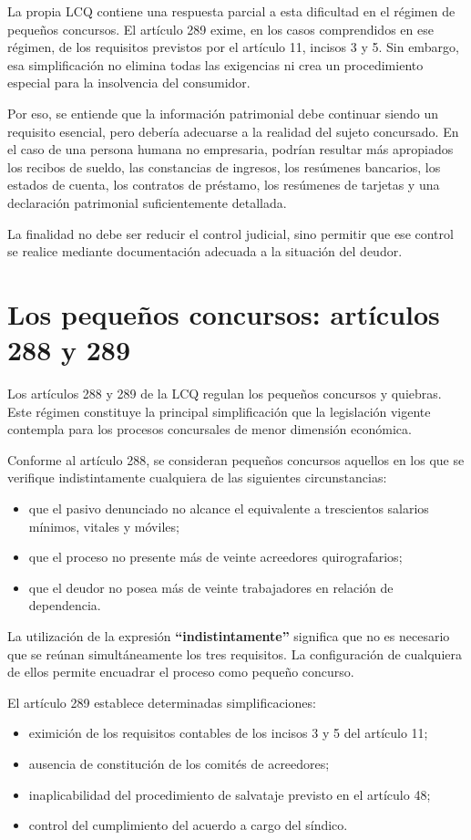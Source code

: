 \documentclass[12pt,oneside]{book}
\begin{document}
La propia LCQ contiene una respuesta parcial a esta dificultad en el régimen de pequeños concursos. El artículo 289 exime, en los casos comprendidos en ese régimen, de los requisitos previstos por el artículo 11, incisos 3 y 5. Sin embargo, esa simplificación no elimina todas las exigencias ni crea un procedimiento especial para la insolvencia del consumidor.

Por eso, se entiende que la información patrimonial debe continuar siendo un requisito esencial, pero debería adecuarse a la realidad del sujeto concursado. En el caso de una persona humana no empresaria, podrían resultar más apropiados los recibos de sueldo, las constancias de ingresos, los resúmenes bancarios, los estados de cuenta, los contratos de préstamo, los resúmenes de tarjetas y una declaración patrimonial suficientemente detallada.

La finalidad no debe ser reducir el control judicial, sino permitir que ese control se realice mediante documentación adecuada a la situación del deudor.

\section{Los pequeños concursos: artículos 288 y 289}

Los artículos 288 y 289 de la LCQ regulan los pequeños concursos y quiebras. Este régimen constituye la principal simplificación que la legislación vigente contempla para los procesos concursales de menor dimensión económica.

Conforme al artículo 288, se consideran pequeños concursos aquellos en los que se verifique indistintamente cualquiera de las siguientes circunstancias:
\begin{itemize}
    \item que el pasivo denunciado no alcance el equivalente a trescientos salarios mínimos, vitales y móviles;
    \item que el proceso no presente más de veinte acreedores quirografarios;
    \item que el deudor no posea más de veinte trabajadores en relación de dependencia.
\end{itemize}

La utilización de la expresión \textbf{``indistintamente''} significa que no es necesario que se reúnan simultáneamente los tres requisitos. La configuración de cualquiera de ellos permite encuadrar el proceso como pequeño concurso.

El artículo 289 establece determinadas simplificaciones:
\begin{itemize}
    \item eximición de los requisitos contables de los incisos 3 y 5 del artículo 11;
    \item ausencia de constitución de los comités de acreedores;
    \item inaplicabilidad del procedimiento de salvataje previsto en el artículo 48;
    \item control del cumplimiento del acuerdo a cargo del síndico.
\end{itemize}
\end{document}
